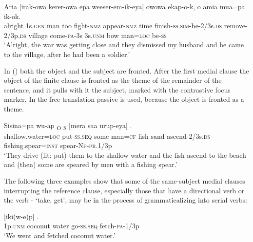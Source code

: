 \ea%
\label{ex:x1464}
\gll Aria       [irak-owa  kerer-owa  epa weeser-em-ik-eya]    owowa  ekap-o-k, o  amia  mua=pa  ik-ok.\\
alright  1s.\textsc{gen} man  too  fight-\textsc{nmz} appear-\textsc{nmz} time finish-\textsc{ss}.\textsc{sim}-be-2/3s.\textsc{ds} remove-2/3p.\textsc{ds} village come-\textsc{pa}-3s 3s.\textsc{unm} bow man=\textsc{loc} be-\textsc{ss}\\
\glt`Alright, the war was getting close and they dismissed my husband and he came to the village, after he had been a soldier.'
\z


In () both the object and the subject are fronted. After the first medial clause the object of the finite clause is fronted as the theme of the remainder of the sentence, and it pulls with it the subject, marked with the contrastive focus marker.  In the free translation passive is used, because the object is fronted as a theme.

\ea%
\label{ex:x1465}
\gll Sisina=pa  wu-ap  \textsubscript{O}  \textsubscript{S}  [mera  saa urup-eya]    . \\
shallow.water=\textsc{loc} put-\textsc{ss}.\textsc{seq} some man=\textsc{cf} fish sand ascend-2/3s.\textsc{ds} fishing.spear=\textsc{inst} spear-\textsc{Np}-\textsc{pr}.1/3p\\
\glt`They drive (lit: put) them to the shallow water and the fish ascend to the beach and (then) some are speared by men with a fishing spear.'
\z


The following three examples show that some of the same-subject medial clauses interrupting the reference clause, especially those that have a directional verb or the verb - `take, get', may be in the process of grammaticalizing into serial verbs: 

\ea%
\label{ex:x1466}
\gll {}    [iki(w-e)p]  . \\
1p.\textsc{unm} coconut  water  go-\textsc{ss}.\textsc{seq} fetch-\textsc{pa}-1/3p\\
\glt`We went and fetched coconut water.'
\z


